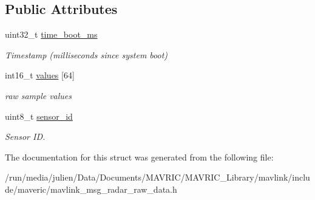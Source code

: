 \subsection*{Public Attributes}
\begin{DoxyCompactItemize}
\item 
\hypertarget{struct____mavlink__radar__raw__data__t_a9aa87b975234ce4ccedfb2ce4a79fc31}{uint32\+\_\+t \hyperlink{struct____mavlink__radar__raw__data__t_a9aa87b975234ce4ccedfb2ce4a79fc31}{time\+\_\+boot\+\_\+ms}}\label{struct____mavlink__radar__raw__data__t_a9aa87b975234ce4ccedfb2ce4a79fc31}

\begin{DoxyCompactList}\small\item\em Timestamp (milliseconds since system boot) \end{DoxyCompactList}\item 
\hypertarget{struct____mavlink__radar__raw__data__t_aae72775aa3276681f14c48c062716f8a}{int16\+\_\+t \hyperlink{struct____mavlink__radar__raw__data__t_aae72775aa3276681f14c48c062716f8a}{values} \mbox{[}64\mbox{]}}\label{struct____mavlink__radar__raw__data__t_aae72775aa3276681f14c48c062716f8a}

\begin{DoxyCompactList}\small\item\em raw sample values \end{DoxyCompactList}\item 
\hypertarget{struct____mavlink__radar__raw__data__t_a678694a34c45b74bef35a6bb9880d14a}{uint8\+\_\+t \hyperlink{struct____mavlink__radar__raw__data__t_a678694a34c45b74bef35a6bb9880d14a}{sensor\+\_\+id}}\label{struct____mavlink__radar__raw__data__t_a678694a34c45b74bef35a6bb9880d14a}

\begin{DoxyCompactList}\small\item\em Sensor I\+D. \end{DoxyCompactList}\end{DoxyCompactItemize}


The documentation for this struct was generated from the following file\+:\begin{DoxyCompactItemize}
\item 
/run/media/julien/\+Data/\+Documents/\+M\+A\+V\+R\+I\+C/\+M\+A\+V\+R\+I\+C\+\_\+\+Library/mavlink/include/maveric/mavlink\+\_\+msg\+\_\+radar\+\_\+raw\+\_\+data.\+h\end{DoxyCompactItemize}
